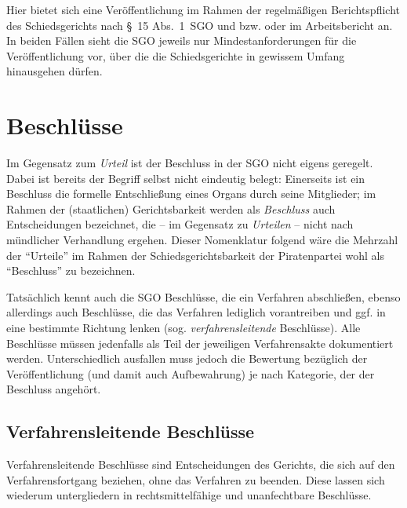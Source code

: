 Hier bietet sich eine Veröffentlichung im Rahmen der regelmäßigen Berichtspflicht des Schiedsgerichts nach \S~15 Abs.~1~SGO und bzw. oder im Arbeitsbericht an.
In beiden Fällen sieht die SGO jeweils nur Mindestanforderungen für die Veröffentlichung vor, über die die Schiedsgerichte in gewissem Umfang hinausgehen dürfen.

\section{Beschlüsse}
\label{Dokumentation:Beschlüsse}
Im Gegensatz zum \emph{Urteil} ist der Beschluss in der SGO nicht eigens geregelt.
Dabei ist bereits der Begriff selbst nicht eindeutig belegt:
Einerseits ist ein Beschluss die formelle Entschließung eines Organs durch seine Mitglieder; im Rahmen der (staatlichen) Gerichtsbarkeit werden als \emph{Beschluss} auch Entscheidungen bezeichnet, die -- im Gegensatz zu \emph{Urteilen} -- nicht nach mündlicher Verhandlung ergehen.
Dieser Nomenklatur folgend wäre die Mehrzahl der \enquote{Urteile} im Rahmen der Schiedsgerichtsbarkeit der Piratenpartei wohl als \enquote{Beschluss} zu bezeichnen.%

Tatsächlich kennt auch die SGO Beschlüsse, die ein Verfahren abschließen, ebenso allerdings auch Beschlüsse, die das Verfahren lediglich vorantreiben und ggf. in eine bestimmte Richtung lenken (sog. \emph{verfahrensleitende} Beschlüsse).
Alle Beschlüsse müssen jedenfalls als Teil der jeweiligen Verfahrensakte dokumentiert werden.
Unterschiedlich ausfallen muss jedoch die Bewertung bezüglich der Veröffentlichung (und damit auch Aufbewahrung) je nach Kategorie, der der Beschluss angehört.

\subsection{Verfahrensleitende Beschlüsse}
\label{Dokumentation:Beschlüsse:Verfahrensleitend}
Verfahrensleitende Beschlüsse sind Entscheidungen des Gerichts, die sich auf den Verfahrensfortgang beziehen, ohne das Verfahren zu beenden.
Diese lassen sich wiederum untergliedern in rechtsmittelfähige und unanfechtbare Beschlüsse.

